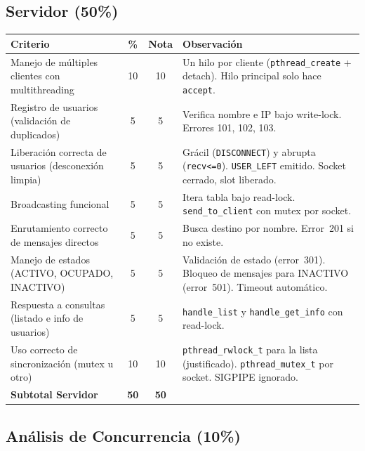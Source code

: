 \documentclass[12pt,a4paper]{article}
\begin{document}
\subsection{Servidor (50\%)}

\begin{longtable}{p{7.5cm}ccp{4cm}}
\toprule
\textbf{Criterio} & \textbf{\%} & \textbf{Nota} & \textbf{Observación} \\
\midrule
\endhead
Manejo de múltiples clientes con multithreading & 10 & 10 &
    Un hilo por cliente (\texttt{pthread\_create} + detach).  Hilo principal solo
    hace \texttt{accept}. \\
\midrule
Registro de usuarios (validación de duplicados) & 5 & 5 &
    Verifica nombre e IP bajo write-lock.  Errores 101, 102, 103. \\
\midrule
Liberación correcta de usuarios (desconexión limpia) & 5 & 5 &
    Grácil (\texttt{DISCONNECT}) y abrupta (\texttt{recv<=0}).
    \texttt{USER\_LEFT} emitido.  Socket cerrado, slot liberado. \\
\midrule
Broadcasting funcional & 5 & 5 &
    Itera tabla bajo read-lock.  \texttt{send\_to\_client} con mutex por socket. \\
\midrule
Enrutamiento correcto de mensajes directos & 5 & 5 &
    Busca destino por nombre.  Error~201 si no existe. \\
\midrule
Manejo de estados (ACTIVO, OCUPADO, INACTIVO) & 5 & 5 &
    Validación de estado (error~301).  Bloqueo de mensajes para INACTIVO
    (error~501).  Timeout automático. \\
\midrule
Respuesta a consultas (listado e info de usuarios) & 5 & 5 &
    \texttt{handle\_list} y \texttt{handle\_get\_info} con read-lock. \\
\midrule
Uso correcto de sincronización (mutex u otro) & 10 & 10 &
    \texttt{pthread\_rwlock\_t} para la lista (justificado).
    \texttt{pthread\_mutex\_t} por socket.  SIGPIPE ignorado. \\
\midrule
\textbf{Subtotal Servidor} & \textbf{50} & \textbf{50} & \\
\bottomrule
\end{longtable}

\subsection{Análisis de Concurrencia (10\%)}
\end{document}
